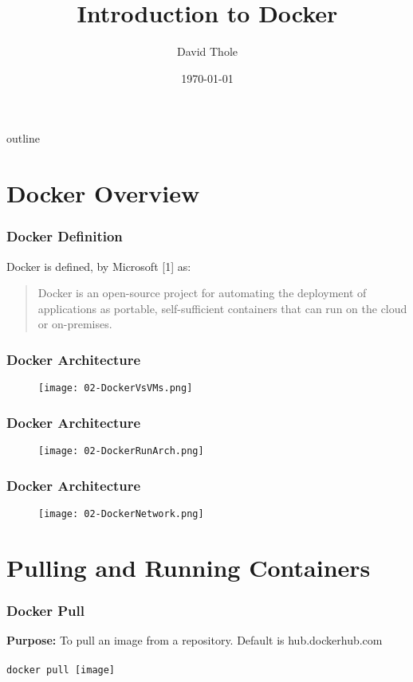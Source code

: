 \documentclass{beamer}
\begin{document}
\title{Introduction to Docker}
\author{David Thole}
\date{\today} 
\begin{frame}
  \titlepage
\end{frame}

\begin{frame}{outline}
  \tableofcontents
\end{frame} 


\section{Docker Overview}
\begin{frame}\frametitle{Docker Definition}
  Docker is defined, by Microsoft \small{[1]} as:
  \begin{quote}
    Docker is an open-source project for automating the deployment of applications as portable, self-sufficient containers that can run on the cloud or on-premises.
  \end{quote}
\end{frame}
\begin{frame}\frametitle{Docker Architecture}
  \begin{figure}
    \texttt{[image: 02-DockerVsVMs.png]}
  \end{figure}
\end{frame}
\begin{frame}\frametitle{Docker Architecture}
  \begin{figure}
    \texttt{[image: 02-DockerRunArch.png]}
  \end{figure}
\end{frame}
\begin{frame}\frametitle{Docker Architecture}
  \begin{figure}
    \texttt{[image: 02-DockerNetwork.png]}
  \end{figure}
\end{frame}

\section{Pulling and Running Containers}
\begin{frame}\frametitle{Docker Pull}
  \textbf{Purpose:} To pull an image from a repository.  Default is hub.dockerhub.com
  \\ \\
  \texttt{docker pull [image]}
\end{frame}
\end{document}
